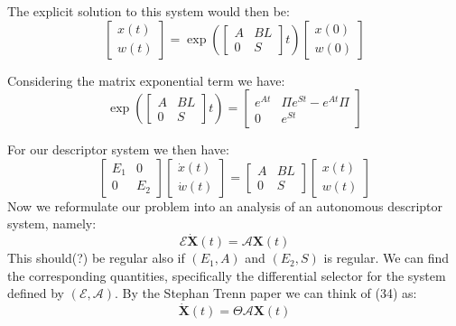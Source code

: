 \documentclass{article}
\begin{document}
The explicit solution to this system would then be: 
\begin{equation}
    \begin{bmatrix}
        x(t) \\
        w(t)
    \end{bmatrix}
    = 
    \exp{\left(
    \begin{bmatrix}
        A & BL \\ 
        0 & S
    \end{bmatrix}t
    \right)}
    \begin{bmatrix}
        x(0) \\ 
        w(0)
    \end{bmatrix}
\end{equation}

Considering the matrix exponential term we have: 
\begin{equation}
    \exp{\left(     
    \begin{bmatrix}
        A & BL \\ 
        0 & S
    \end{bmatrix}t
    \right)}
    =
    \begin{bmatrix}
        e^{At} & \Pi e^{St} - e^{At} \Pi \\
        0 & e^{St}
    \end{bmatrix}
\end{equation}

For our descriptor system we then have:
\begin{equation}
    \begin{bmatrix}
        E_1 & 0 \\
        0 & E_2 
    \end{bmatrix}
    \begin{bmatrix}
        \dot{x}(t) \\
        \dot{w}(t)
    \end{bmatrix}
    = 
    \begin{bmatrix}
        A & BL \\
        0 & S
    \end{bmatrix}
    \begin{bmatrix}
        x(t) \\
        w(t)
    \end{bmatrix}
\end{equation}
Now we reformulate our problem into an analysis of an autonomous descriptor system, namely: 
\begin{equation}
    \mathcal{E} \dot{\mathbf{X}}(t) = \mathcal{A} \mathbf{X}(t)
\end{equation}
This should(?) be regular also if $(E_1, A)$ and $(E_2, S)$ is regular.
We can find the corresponding quantities, specifically the differential selector for the 
system defined by $(\mathcal{E}, \mathcal{A})$. 
By the Stephan Trenn paper we can think of (34) as: 
\begin{equation}
\dot{\mathbf{X}}(t) = \Theta \mathcal{A} \mathbf{X}(t)
\end{equation}
\end{document}
